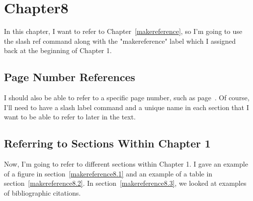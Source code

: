 
\cleardoublepage


\chapter{Chapter8}
\label{makereference8}

In this chapter, I want to refer to Chapter~\ref{makereference},
so I'm going to use the slash ref command along with the
"makereference" label which I assigned back at the beginning of
Chapter 1.

\section{Page Number References}
\label{makereference7.1} I should also be able to refer to a
specific page number, such as page~\pageref{makereference}.  Of
course, I'll need to have a slash label command and a unique name
in each section that I want to be able to refer to later in the
text.

\section{Referring to Sections Within Chapter 1}
\label{makereference7.2} Now, I'm going to refer to different
sections within Chapter 1. I gave an example of a figure in
section~\ref{makereference8.1} and an example of a table in
section~\ref{makereference8.2}.  In
section~\ref{makereference8.3}, we looked at examples of
bibliographic citations.
